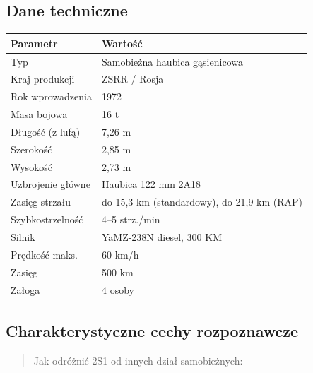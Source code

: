 \documentclass[12pt,oneside]{book}
\begin{document}
\subsection{Dane techniczne}\label{dane-techniczne-19}

\begin{longtable}[]{@{}ll@{}}
\toprule\noalign{}
Parametr & Wartość \\
\midrule\noalign{}
\endhead
\bottomrule\noalign{}
\endlastfoot
Typ & Samobieżna haubica gąsienicowa \\
Kraj produkcji & ZSRR / Rosja \\
Rok wprowadzenia & 1972 \\
Masa bojowa & 16 t \\
Długość (z lufą) & 7,26 m \\
Szerokość & 2,85 m \\
Wysokość & 2,73 m \\
Uzbrojenie główne & Haubica 122 mm 2A18 \\
Zasięg strzału & do 15,3 km (standardowy), do 21,9 km (RAP) \\
Szybkostrzelność & 4--5 strz./min \\
Silnik & YaMZ-238N diesel, 300 KM \\
Prędkość maks. & 60 km/h \\
Zasięg & 500 km \\
Załoga & 4 osoby \\
\end{longtable}

\subsection{Charakterystyczne cechy
rozpoznawcze}\label{charakterystyczne-cechy-rozpoznawcze-19}

\begin{quote}
Jak odróżnić 2S1 od innych dział samobieżnych:
\end{quote}
\end{document}
